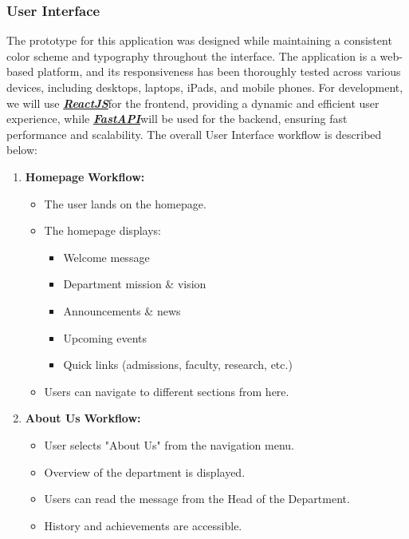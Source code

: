 \documentclass[11pt]{article}
\newcommand{\ReactJS}{\href{https://react.dev/}{\textbf{\textcolor{reactColor}{\textit{ReactJS}}}}}
\newcommand{\FastAPI}{\href{https://fastapi.tiangolo.com/}{\textbf{{\textcolor{fastAPIColor}{\textit{FastAPI}}}}}}
\begin{document}
\subsubsection{User Interface}
The prototype for this application was designed while maintaining a consistent color scheme and typography throughout the interface. The application is a web-based platform, and its responsiveness has been thoroughly tested across various devices, including desktops, laptops, iPads, and mobile phones. For development, we will use \ReactJS\space for the frontend, providing a dynamic and efficient user experience, while \FastAPI\space will be used for the backend, ensuring fast performance and scalability. The overall User Interface workflow is described below:

\begin{enumerate}
    \item \textbf{Homepage}
    \textbf{Workflow:}
    \begin{itemize}
        \item The user lands on the homepage.
        \item The homepage displays:
        \begin{itemize}
            \item Welcome message
            \item Department mission \& vision
            \item Announcements \& news
            \item Upcoming events
            \item Quick links (admissions, faculty, research, etc.)
        \end{itemize}
        \item Users can navigate to different sections from here.
    \end{itemize}

    \item \textbf{About Us}
    \textbf{Workflow:}
    \begin{itemize}
        \item User selects "About Us" from the navigation menu.
        \item Overview of the department is displayed.
        \item Users can read the message from the Head of the Department.
        \item History and achievements are accessible.
    \end{itemize}


\end{enumerate}
\end{document}
